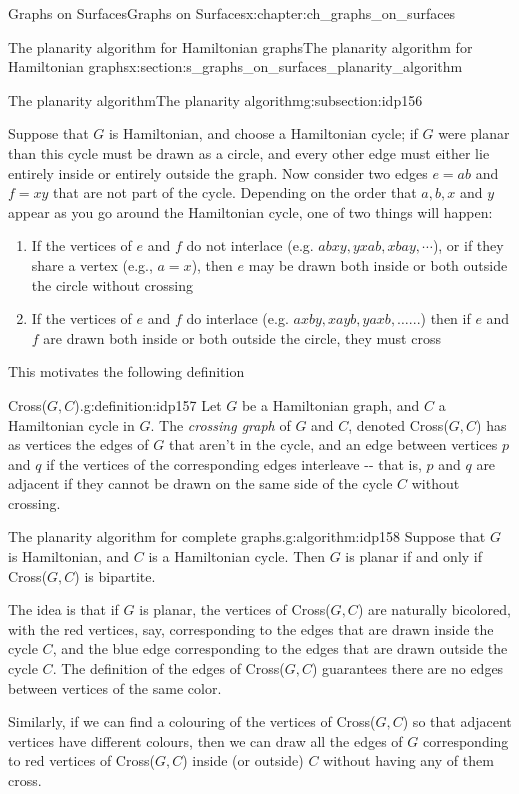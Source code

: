 \documentclass[oneside,10pt,]{book}
\numberwithin{equation}{section}
\begin{document}
\begin{chapterptx}{Graphs on Surfaces}{}{Graphs on Surfaces}{}{}{x:chapter:ch_graphs_on_surfaces}
\begin{sectionptx}{The planarity algorithm for Hamiltonian graphs}{}{The planarity algorithm for Hamiltonian graphs}{}{}{x:section:s_graphs_on_surfaces_planarity_algorithm}
\begin{subsectionptx}{The planarity algorithm}{}{The planarity algorithm}{}{}{g:subsection:idp156}
\par
Suppose that \(G\) is Hamiltonian, and choose a Hamiltonian cycle; if \(G\) were planar than this cycle must be drawn as a circle, and every other edge must either lie entirely inside or entirely outside the graph.  Now consider two edges \(e=ab\) and \(f=xy\) that are not part of the cycle.  Depending on the order that \(a,b,x\) and \(y\) appear as you go around the Hamiltonian cycle, one of two things will happen:%
\begin{enumerate}
\item{}If the vertices of \(e\) and \(f\) do not interlace (e.g. \(abxy, yxab, xbay,\cdots\)), or if they share a vertex (e.g., \(a=x\)), then \(e\) may be drawn both inside or both outside the circle without crossing%
\item{}If the vertices of \(e\) and \(f\) do interlace (e.g. \(axby, xayb, yaxb,\dots...\)) then if \(e\) and \(f\) are drawn both inside or both outside the circle, they must cross%
\end{enumerate}
%
\par
This motivates the following definition%
\begin{definition}{Cross(\(G,C\)).}{g:definition:idp157}%
Let \(G\) be a Hamiltonian graph, and \(C\) a Hamiltonian cycle in \(G\).  The \emph{crossing graph} of \(G\) and \(C\), denoted Cross(\(G,C\)) has as vertices the edges of \(G\) that aren't in the cycle, and an edge between vertices \(p\) and \(q\) if the vertices of the corresponding edges interleave -{}-{} that is, \(p\) and \(q\) are adjacent if they cannot be drawn on the same side of the cycle \(C\) without crossing.%
\end{definition}
\begin{algorithm}{The planarity algorithm for complete graphs.}{}{g:algorithm:idp158}%
Suppose that \(G\) is Hamiltonian, and \(C\) is a Hamiltonian cycle.  Then \(G\) is planar if and only if Cross(\(G,C\)) is bipartite.%
\end{algorithm}
The idea is that if \(G\) is planar, the vertices of Cross(\(G,C\)) are naturally bicolored, with the red vertices, say, corresponding to the edges that are drawn inside the cycle \(C\), and the blue edge corresponding to the edges that are drawn outside the cycle \(C\).  The definition of the edges of Cross(\(G,C\)) guarantees there are no edges between vertices of the same color.%
\par
Similarly, if we can find a colouring of the vertices of Cross(\(G,C\)) so that adjacent vertices have different colours, then we can draw all the edges of \(G\) corresponding to red vertices of Cross(\(G,C\)) inside (or outside) \(C\) without having any of them cross.%

\end{subsectionptx}
\end{sectionptx}
\end{chapterptx}
\end{document}
